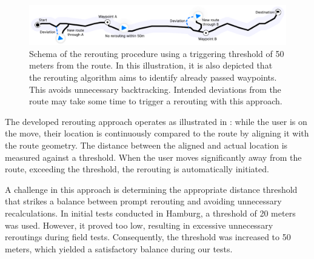 \begin{figure}[t]
\centering
\includegraphics[width=\linewidth]{images/rerouting-strategy.pdf}
\caption{Schema of the rerouting procedure using a triggering threshold of 50 meters from the route. In this illustration, it is also depicted that the rerouting algorithm aims to identify already passed waypoints. This avoids unnecessary backtracking. Intended deviations from the route may take some time to trigger a rerouting with this approach.}
\label{fig:rerouting-strategy}
\end{figure}

The developed rerouting approach operates as illustrated in : while the user is on the move, their location is continuously compared to the route by aligning it with the route geometry. The distance between the aligned and actual location is measured against a threshold. When the user moves significantly away from the route, exceeding the threshold, the rerouting is automatically initiated. 

A challenge in this approach is determining the appropriate distance threshold that strikes a balance between prompt rerouting and avoiding unnecessary recalculations. In initial tests conducted in Hamburg, a threshold of 20 meters was used. However, it proved too low, resulting in excessive unnecessary reroutings during field tests. Consequently, the threshold was increased to 50 meters, which yielded a satisfactory balance during our tests.

